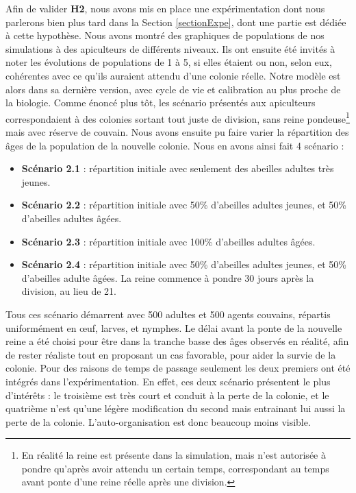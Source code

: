 			Afin de valider \textbf{H2}, nous avons mis en place une expérimentation dont nous parlerons bien plus tard dans la Section \ref{sectionExpe}, dont une partie est dédiée à cette hypothèse. Nous avons montré des graphiques de populations de nos simulations à des apiculteurs de différents niveaux. Ils ont ensuite été invités à noter les évolutions de populations de 1 à 5, si elles étaient ou non, selon eux, cohérentes avec ce qu'ils auraient attendu d'une colonie réelle. Notre modèle est alors dans sa dernière version, avec cycle de vie et calibration au plus proche de la biologie. Comme énoncé plus tôt, les scénario présentés aux apiculteurs correspondaient à des colonies sortant tout juste de division, sans reine pondeuse\footnote{En réalité la reine est présente dans la simulation, mais n'est autorisée à pondre qu'après avoir attendu un certain temps, correspondant au temps avant ponte d'une reine réelle après une division.} mais avec réserve de couvain. Nous avons ensuite pu faire varier la répartition des âges de la population de la nouvelle colonie. Nous en avons ainsi fait 4 scénario :
				\begin{itemize}
					\item \textbf{Scénario 2.1} : répartition initiale avec seulement des abeilles adultes très jeunes.
					\item \textbf{Scénario 2.2} : répartition initiale avec 50\% d'abeilles adultes jeunes, et 50\% d'abeilles adultes âgées.
					\item \textbf{Scénario 2.3} : répartition initiale avec 100\% d'abeilles adultes âgées.
					\item \textbf{Scénario 2.4} : répartition initiale avec 50\% d'abeilles adultes jeunes, et 50\% d'abeilles adulte âgées. La reine commence à pondre 30 jours après la division, au lieu de 21.
				\end{itemize}
				
				Tous ces scénario démarrent avec 500 adultes et 500  agents couvains, répartis uniformément en œuf, larves, et nymphes.  Le délai avant la ponte de la nouvelle reine a été choisi pour être dans la tranche basse des âges observés en réalité, afin de rester réaliste tout en proposant un cas favorable, pour aider la survie de la colonie. Pour des raisons de temps de passage seulement les deux premiers ont été intégrés dans l'expérimentation. En effet, ces deux scénario présentent le plus d'intérêts : le troisième est très court et conduit à la perte de la colonie, et le quatrième n'est qu'une légère modification du second mais entrainant lui aussi la perte de la colonie. L'auto-organisation est donc beaucoup moins visible.
				

